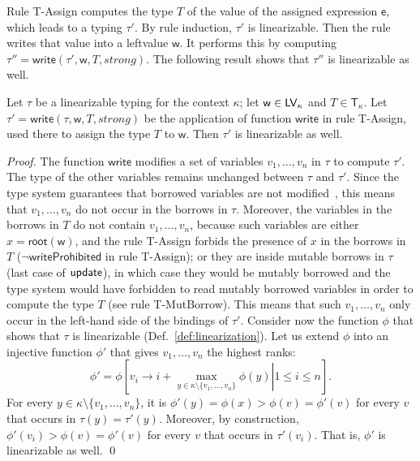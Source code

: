 Rule \textsf{T-Assign} computes the type $T$ of the value of the assigned expression
$\mathsf{e}$, which leads to a typing $\tau'$. By rule induction, $\tau'$ is
linearizable. Then the rule writes that value into a leftvalue $\mathsf{w}$.
It performs this by computing $\tau''=\mathsf{write}(\tau',\mathsf{w},T,\mathit{strong})$.
The following result shows that $\tau''$ is linearizable as well.

\begin{lemma}\label{lem:write_invariant}
  Let $\tau$ be a linearizable typing for the context $\kappa$;
  let $\mathsf{w}\in\mathsf{LV}_\kappa$ and $T\in\mathsf{T}_\kappa$.
  Let $\tau'=\mathsf{write}(\tau,\mathsf{w},T,\mathit{strong})$ be
  the application of function $\mathsf{write}$ in rule \textsf{T-Assign},
  used there to assign the type $T$ to $\mathsf{w}$.
  Then $\tau'$ is linearizable as well.
\end{lemma}
\begin{proof}
  The function $\mathsf{write}$ modifies a set of variables $v_1,\ldots,v_n$ in $\tau$ to compute $\tau'$.
  The type of the other variables remains unchanged between $\tau$ and $\tau'$. Since the
  type system guarantees that borrowed variables are not modified~\cite{Pearce21},
  this means that $v_1,\ldots,v_n$ do not occur in the borrows in $\tau$. Moreover,
  the variables in the borrows in $T$ do not contain $v_1,\ldots,v_n$, because
  such variables are either $x=\mathsf{root}(\mathsf{w})$, and the rule \textsf{T-Assign}
  forbids the presence of $x$ in the borrows in $T$ ($\neg\mathsf{writeProhibited}$ in rule
  \textsf{T-Assign}); or they are inside mutable borrows in $\tau$ (last case of
  $\mathsf{update}$), in which case they would be mutably borrowed and the type system
  would have forbidden to read mutably borrowed variables in order to compute
  the type $T$ (see rule \textsf{T-MutBorrow}).
  This means that such $v_1,\ldots,v_n$ only occur in the left-hand side of the bindings of $\tau'$.
  Consider now the function $\phi$ that shows that $\tau$ is linearizable
  (Def.~\ref{def:linearization}).
  Let us extend $\phi$ into an injective function $\phi'$
  that gives $v_1,\ldots,v_n$ the highest ranks:
  \[
  \phi'=\phi\left[\left.v_i\to i+\max\limits_{y\in\kappa\setminus\{v_1,\ldots,v_n\}}\phi(y)\right|1\le i\le n\right].
  \]
  For every $y\in\kappa\setminus\{v_1,\ldots,v_n\}$, it is
  $\phi'(y)=\phi(x)>\phi(v)=\phi'(v)$ for every $v$ that occurs in $\tau(y)=\tau'(y)$.
  Moreover, by construction, $\phi'(v_i)>\phi(v)=\phi'(v)$ for every $v$ that occurs in $\tau'(v_i)$.
  That is, $\phi'$ is linearizable as well.
  \qed
\end{proof}
